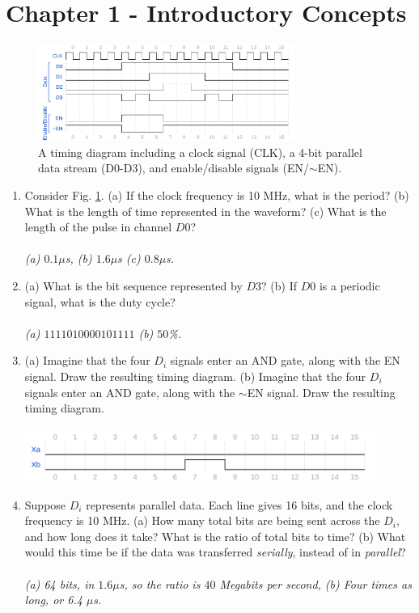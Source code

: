 \documentclass[10pt]{article}
\begin{document}
\maketitle

\section{Chapter 1 - Introductory Concepts}
\begin{figure}[ht]
\centering
\includegraphics[width=0.75\textwidth]{timingExample1.pdf}
\caption{\label{fig:timing1} A timing diagram including a clock signal (CLK), a 4-bit parallel data stream (D0-D3), and enable/disable signals (EN/$\sim$EN).}
\end{figure}
\begin{enumerate}
\item Consider Fig. \ref{fig:timing1}. (a) If the clock frequency is 10 MHz, what is the period?  (b) What is the length of time represented in the waveform? (c) What is the length of the pulse in channel $D0$? \\ \\ 
\textit{(a) $0.1 \mu$s, (b) $1.6 \mu$s (c) $0.8 \mu$s.}
\item (a) What is the bit sequence represented by $D3$? (b) If $D0$ is a periodic signal, what is the duty cycle? \\ \\
\textit{(a) $1111010000101111$ (b) $50$\%.}
\item (a) Imagine that the four $D_i$ signals enter an AND gate, along with the EN signal.  Draw the resulting timing diagram. (b) Imagine that the four $D_i$ signals enter an AND gate, along with the $\sim$EN signal.  Draw the resulting timing diagram. \\ \\
\includegraphics[width=0.9\textwidth]{timingExample4.pdf}
\item Suppose $D_i$ represents parallel data.  Each line gives 16 bits, and the clock frequency is 10 MHz.  (a) How many total bits are being sent across the $D_i$, and how long does it take?  What is the ratio of total bits to time?  (b) What would this time be if the data was transferred \textit{serially}, instead of in \textit{parallel}? \\ \\
\textit{(a) 64 bits, in $1.6 \mu$s, so the ratio is $40$ Megabits per second, (b) Four times as long, or 6.4 $\mu$s.}
\end{enumerate}
\end{document}
